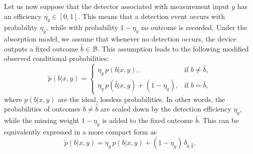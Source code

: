 \documentclass[aps,pra,reprint, superscriptaddress,showkeys]{revtex4-2}
\theoremstyle{plain}
\begin{document}
Let us now suppose that the detector associated with measurement input \( y \) has an efficiency \( \eta_y \in [0,1] \). This means that a detection event occurs with probability \( \eta_y \), while with probability \( 1 - \eta_y \) no outcome is recorded. Under the absorption model, we assume that whenever no detection occurs, the device outputs a fixed outcome \( \hat b \in \mathcal{B} \). This assumption leads to the following modified observed conditional probabilities:
\begin{equation}
\tilde{p}(b|x,y) =
\begin{cases}
\eta_y\, p(b|x,y), & \text{if } b \neq \hat b, \\
\eta_y\, p(\hat b|x,y) + (1 - \eta_y), & \text{if } b = \hat b,
\end{cases}
\end{equation}
where \( p(b|x,y) \) are the ideal, lossless probabilities. In other words, the probabilities of outcomes \( b \neq \hat b \) are scaled down by the detection efficiency \( \eta_y \), while the missing weight \( 1 - \eta_y \) is added to the fixed outcome \( \hat b \). This can be equivalently expressed in a more compact form as
\begin{equation}
\tilde{p}(b|x,y) = \eta_y\, p(b|x,y) + (1 - \eta_y)\, \delta_{b,\hat b}.
\end{equation}
\end{document}
